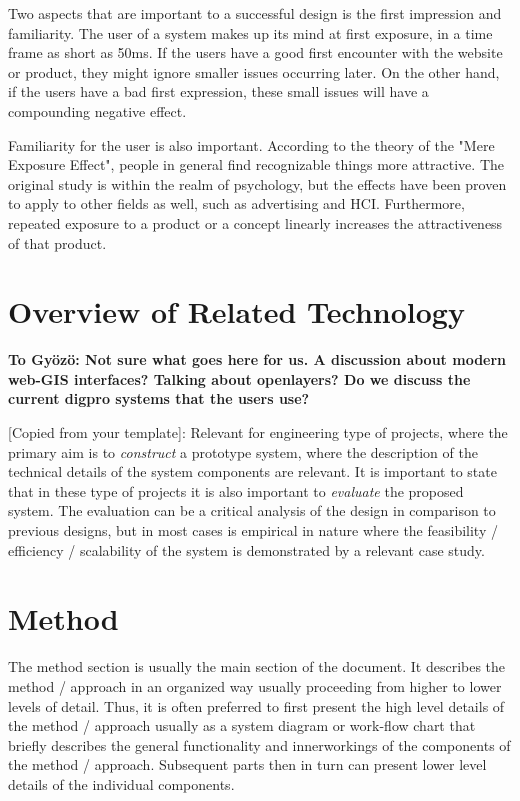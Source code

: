 \documentclass[a4paper,12pt,titlepage]{article}
\begin{document}
Two aspects that are important to a successful design is the first impression and familiarity. The user of a system makes up its mind at first exposure, in a time frame as short as 50ms. If the users have a good first encounter with the website or product, they might ignore smaller issues occurring later. On the other hand, if the users have a bad first expression, these small issues will have a compounding negative effect. 

Familiarity for the user is also important. According to the theory of the "Mere Exposure Effect", people in general find recognizable things more attractive. \citep{zajonc} The original study is within the realm of psychology, but the effects have been proven to apply to other fields as well, such as advertising and HCI. Furthermore, repeated exposure to a product or a concept linearly increases the attractiveness of that product. \citep{hekkert}

\section{Overview of Related Technology}

\textbf{To Gyözö: Not sure what goes here for us. A discussion about modern web-GIS interfaces? Talking about openlayers? Do we discuss the current digpro systems that the users use?}

[Copied from your template]:
Relevant for engineering type of projects, where the primary aim is to \emph{construct} a prototype system, where the description of the technical details of the system components are relevant. It is important to state that in these type of projects it is also important to \emph{evaluate} the proposed system. The evaluation can be a critical analysis of the design in comparison to previous designs, but in most cases is empirical in nature where the feasibility / efficiency / scalability of the system is demonstrated by a relevant case study. 


\section{Method}

The method section is usually the main section of the document. It describes the method / approach in an organized way usually proceeding from higher to lower levels of detail. Thus, it is often preferred to first present the high level details of the method / approach usually as a system diagram or work-flow chart that briefly describes the general functionality and innerworkings of the components of the method / approach. Subsequent parts then in turn can present lower level details of the individual components.
\end{document}
